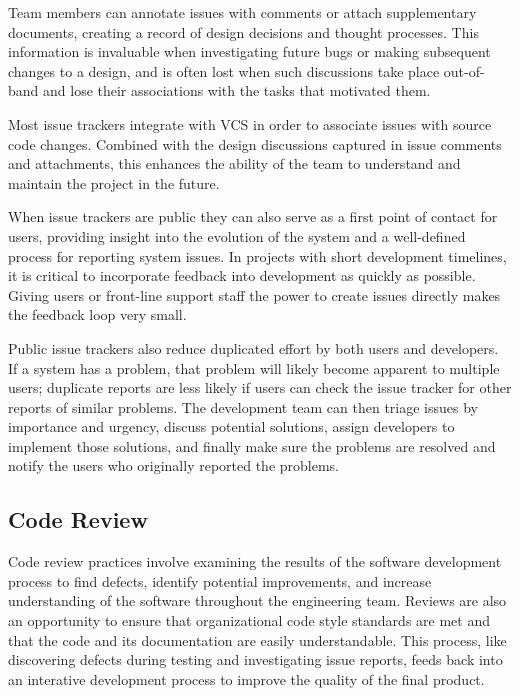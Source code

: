 Team members can annotate issues with comments or attach supplementary
documents, creating a record of design decisions and thought
processes. This information is invaluable when investigating future
bugs or making subsequent changes to a design, and is often lost when
such discussions take place out-of-band and lose their associations
with the tasks that motivated them.

Most issue trackers integrate with VCS in order to associate issues
with source code changes. Combined with the design discussions
captured in issue comments and attachments, this enhances the ability
of the team to understand and maintain the project in the future.

When issue trackers are public they can also serve as a first point of
contact for users, providing insight into the evolution of the system
and a well-defined process for reporting system issues. In projects
with short development timelines, it is critical to incorporate
feedback into development as quickly as possible. Giving users or
front-line support staff the power to create issues directly makes the
feedback loop very small.

Public issue trackers also reduce duplicated effort by both users and
developers. If a system has a problem, that problem will likely become
apparent to multiple users; duplicate reports are less likely if users
can check the issue tracker for other reports of similar problems. The
development team can then triage issues by importance and urgency,
discuss potential solutions, assign developers to implement those
solutions, and finally make sure the problems are resolved and notify
the users who originally reported the problems.

\subsection{Code Review}

Code review practices involve examining the results of the software
development process to find defects, identify potential improvements,
and increase understanding of the software throughout the engineering
team. Reviews are also an opportunity to ensure that organizational
code style standards are met and that the code and its documentation
are easily understandable. This process, like discovering defects
during testing and investigating issue reports, feeds back into an
interative development process to improve the quality of the final
product.


